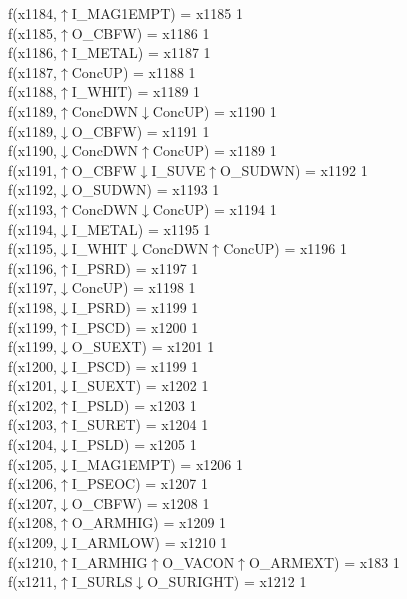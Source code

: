 f(x1184,$\uparrow$I\_MAG1EMPT) = x1185 {1} \\
f(x1185,$\uparrow$O\_CBFW) = x1186 {1} \\
f(x1186,$\uparrow$I\_METAL) = x1187 {1} \\
f(x1187,$\uparrow$ConcUP) = x1188 {1} \\
f(x1188,$\uparrow$I\_WHIT) = x1189 {1} \\
f(x1189,$\uparrow$ConcDWN$\downarrow$ConcUP) = x1190 {1} \\
f(x1189,$\downarrow$O\_CBFW) = x1191 {1} \\
f(x1190,$\downarrow$ConcDWN$\uparrow$ConcUP) = x1189 {1} \\
f(x1191,$\uparrow$O\_CBFW$\downarrow$I\_SUVE$\uparrow$O\_SUDWN) = x1192 {1} \\
f(x1192,$\downarrow$O\_SUDWN) = x1193 {1} \\
f(x1193,$\uparrow$ConcDWN$\downarrow$ConcUP) = x1194 {1} \\
f(x1194,$\downarrow$I\_METAL) = x1195 {1} \\
f(x1195,$\downarrow$I\_WHIT$\downarrow$ConcDWN$\uparrow$ConcUP) = x1196 {1} \\
f(x1196,$\uparrow$I\_PSRD) = x1197 {1} \\
f(x1197,$\downarrow$ConcUP) = x1198 {1} \\
f(x1198,$\downarrow$I\_PSRD) = x1199 {1} \\
f(x1199,$\uparrow$I\_PSCD) = x1200 {1} \\
f(x1199,$\downarrow$O\_SUEXT) = x1201 {1} \\
f(x1200,$\downarrow$I\_PSCD) = x1199 {1} \\
f(x1201,$\downarrow$I\_SUEXT) = x1202 {1} \\
f(x1202,$\uparrow$I\_PSLD) = x1203 {1} \\
f(x1203,$\uparrow$I\_SURET) = x1204 {1} \\
f(x1204,$\downarrow$I\_PSLD) = x1205 {1} \\
f(x1205,$\downarrow$I\_MAG1EMPT) = x1206 {1} \\
f(x1206,$\uparrow$I\_PSEOC) = x1207 {1} \\
f(x1207,$\downarrow$O\_CBFW) = x1208 {1} \\
f(x1208,$\uparrow$O\_ARMHIG) = x1209 {1} \\
f(x1209,$\downarrow$I\_ARMLOW) = x1210 {1} \\
f(x1210,$\uparrow$I\_ARMHIG$\uparrow$O\_VACON$\uparrow$O\_ARMEXT) = x183 {1} \\
f(x1211,$\uparrow$I\_SURLS$\downarrow$O\_SURIGHT) = x1212 {1} \\
